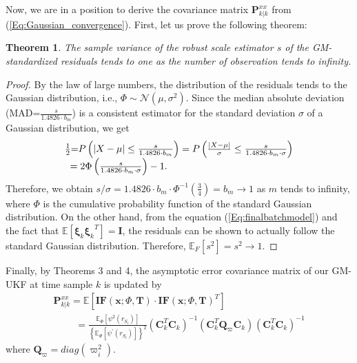 \documentclass[10pt]{IEEEtran}
\newtheorem{theorem}{Theorem}
\begin{document}
Now, we are in a position to derive the covariance matrix $\bm{P}_{k| k }^{xx}$ from (\ref{Eq:Gaussian_convergence}). First, let us prove the following theorem:
\begin{theorem}
The sample variance of the robust scale estimator $s$ of the GM-standardized residuals tends to one as the number of observation tends to infinity.
\end{theorem}
\begin{proof}
By the law of large numbers, the distribution of the residuals tends to the Gaussian distribution, i.e., $\Phi\sim\mathcal{N}(\mu,\sigma^2)$. Since the median absolute deviation (MAD=$\frac{s}{{1.4826 \cdot {b_m}}}$) is a consistent estimator for the standard deviation $\sigma$ of a Gaussian distribution, we get
\begin{equation}
\begin{array}{l}
\frac{1}{2}{\rm{ = }}P\left( {\left| {X - \mu } \right| \le \frac{s}{{1.4826 \cdot {b_m}}}} \right) = P\left( {\frac{{\left| {X - \mu } \right|}}{\sigma } \le \frac{s}{{1.4826 \cdot {b_m} \cdot \sigma }}} \right)\\
 \;\;= 2\Phi \left( {\frac{s}{{1.4826 \cdot {b_m} \cdot \sigma }}} \right) - 1.
\end{array}
\end{equation}
Therefore, we obtain $s/\sigma = 1.4826 \cdot {b_m} \cdot {\Phi ^{ - 1}}\left( {\frac{3}{4}} \right) = {b_m} \to 1$ as $m$ tends to infinity, where $\Phi$ is the cumulative probability function of the standard Gaussian distribution. On the other hand, from the equation (\ref{Eq:finalbatchmodel}) and the fact that $\mathbb{E}[{\bm{\xi} _k}{\bm{\xi}_k}^T]=\bm{I}$, the residuals can be shown to actually follow the standard Gaussian distribution. Therefore, $\mathbb{E}_F[s^2]=s^2\to 1$.
\end{proof}

Finally, by Theorems 3 and 4, the asymptotic error covariance matrix of our GM-UKF at time sample $k$ is updated by
\begin{equation}
\begin{array}{l}
{\bm{P} _{k\left| k \right.}^{xx}}=\mathbb{E}[ {\bm{IF}(\bm{x};\Phi,\bm{T}) \cdot \bm{I{F}}(\bm{x};\Phi,\bm{T})^T}]\\
\quad\quad\; = \frac{{{\mathbb{E}_\Phi}\left[ {{\psi ^2}\left( {{r_{{S_i}}}} \right)} \right]}}{{{{\left\{ {{\mathbb{E}_\Phi}\left[ {{\psi ^{\prime}}\left( {{r_{{S_i}}}} \right)} \right]} \right\}}^2}}}{\left( {{\bm{C}_k^T}\bm{C}_k} \right)^{ - 1}}{\left( {{\bm{C}_k^T}{\bm{Q}_\varpi }\bm{C}_k} \right)^{}}{\left( {{\bm{C}_k^T}\bm{C}_k} \right)^{ - 1}}
\end{array}
\label{Eq:updatingSigmafinal}
\end{equation}
where ${\bm{Q}_\varpi} = diag\left( {\varpi _i^2} \right)$.
\end{document}
